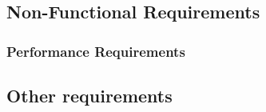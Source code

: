 	\subsection{Non-Functional Requirements}
		\subsubsection{Performance Requirements}
	\subsection{Other requirements}
	